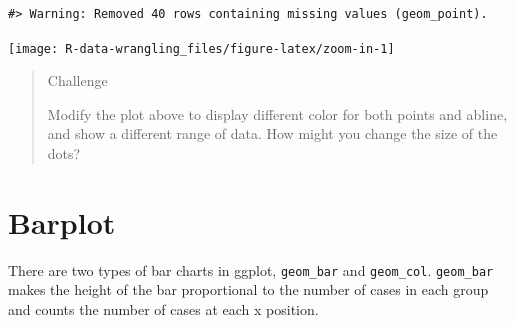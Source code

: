 \documentclass[]{book}
\newenvironment{Shaded}{\begin{snugshade}}{\end{snugshade}}
\newcommand{\KeywordTok}[1]{\textcolor[rgb]{0.13,0.29,0.53}{\textbf{#1}}}
\newcommand{\DataTypeTok}[1]{\textcolor[rgb]{0.13,0.29,0.53}{#1}}
\newcommand{\DecValTok}[1]{\textcolor[rgb]{0.00,0.00,0.81}{#1}}
\newcommand{\FloatTok}[1]{\textcolor[rgb]{0.00,0.00,0.81}{#1}}
\newcommand{\StringTok}[1]{\textcolor[rgb]{0.31,0.60,0.02}{#1}}
\newcommand{\OperatorTok}[1]{\textcolor[rgb]{0.81,0.36,0.00}{\textbf{#1}}}
\newcommand{\NormalTok}[1]{#1}
\theoremstyle{definition}
\theoremstyle{definition}
\theoremstyle{definition}
\theoremstyle{remark}
\begin{document}
\begin{Shaded}
\end{Shaded}

\begin{verbatim}
#> Warning: Removed 40 rows containing missing values (geom_point).
\end{verbatim}

\texttt{[image: R-data-wrangling\_files/figure-latex/zoom-in-1]}

\begin{quote}
Challenge

Modify the plot above to display different color for both points and
abline, and show a different range of data. How might you change the
size of the dots?
\end{quote}

\section{Barplot}\label{barplot}

There are two types of bar charts in ggplot, \texttt{geom\_bar} and
\texttt{geom\_col}. \texttt{geom\_bar} makes the height of the bar
proportional to the number of cases in each group and counts the number
of cases at each x position.
\end{document}
